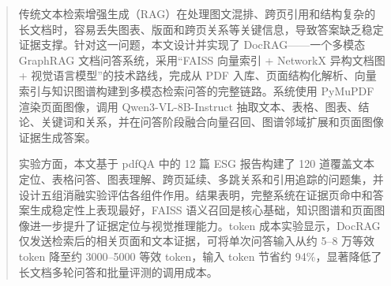 
\begin{abstract}

传统文本检索增强生成（RAG）在处理图文混排、跨页引用和结构复杂的长文档时，容易丢失图表、版面和跨页关系等关键信息，导致答案缺乏稳定证据支撑。针对这一问题，本文设计并实现了 DocRAG——一个多模态 GraphRAG 文档问答系统，采用``FAISS 向量索引 + NetworkX 异构文档图 + 视觉语言模型''的技术路线，完成从 PDF 入库、页面结构化解析、向量索引与知识图谱构建到多模态检索问答的完整链路。系统使用 PyMuPDF 渲染页面图像，调用 Qwen3-VL-8B-Instruct 抽取文本、表格、图表、结论、关键词和关系，并在问答阶段融合向量召回、图谱邻域扩展和页面图像证据生成答案。

实验方面，本文基于 pdfQA 中的 12 篇 ESG 报告构建了 120 道覆盖文本定位、表格问答、图表理解、跨页延续、多跳关系和引用追踪的问题集，并设计五组消融实验评估各组件作用。结果表明，完整系统在证据页命中和答案生成稳定性上表现最好，FAISS 语义召回是核心基础，知识图谱和页面图像进一步提升了证据定位与视觉推理能力。token 成本实验显示，DocRAG 仅发送检索后的相关页面和文本证据，可将单次问答输入从约 5--8 万等效 token 降至约 3000--5000 等效 token，输入 token 节省约 94\%，显著降低了长文档多轮问答和批量评测的调用成本。

\end{abstract}
